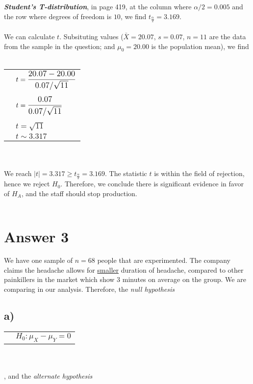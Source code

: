 \documentclass[12pt]{article}
\begin{document}
\textit{\textbf{Student’s T-distribution}}, in page 419, at the 
column where $\alpha/2=0.005$
and the row where degrees of freedom is $10$, we find
$t_{\frac{\alpha}{2}}=3.169$.
\\ \\
We can calculate $t$. Subsituting values
($\bar{X}=20.07$, $s=0.07$, $n=11$ are the data from 
the sample in the question; and $\mu_0=20.00$ is the 
population mean), we find
\\ \\
\begin{tabular}{l l}
    &$t=\bilargeMathText{\frac{20.07-20.00}{0.07/\sqrt{11}}}$\\
    &\\
    &$t=\bilargeMathText{\frac{0.07}{0.07/\sqrt{11}}}$\\
    &\\
    &$t=\sqrt{11}$\\
    &$t \sim 3.317$\\
\end{tabular}
\\ \\
We reach $|t|=3.317 \geq t_{\frac{\alpha}{2}}=3.169$.
The statistic $t$ is within the field of rejection, 
hence we reject $H_0$.
Therefore, we conclude there is significant evidence
in favor of $H_A$, and the staff should stop production.
\\ \\
\section*{Answer 3}

We have one sample of $n=68$ people that
are experimented. 
The company claims the headache
allows for \underline{smaller} 
duration of headache, compared to other 
painkillers in the market which show
$3$ minutes on average on the group.
We are comparing in our analysis.
Therefore, the \textit{null hypothesis}
\subsection*{a)}
\begin{tabular}{l l}
    &$H_0: \mu_X-\mu_Y = 0$\\
\end{tabular}
\\ \\
, and the \textit{alternate hypothesis} 
\end{document}
